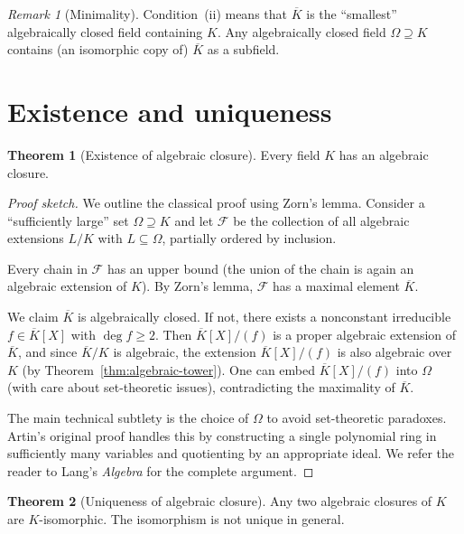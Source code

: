 \documentclass[12pt,a4paper,openany]{book}
\theoremstyle{definition}
\newtheorem{theorem}{Theorem}[chapter]
\theoremstyle{remark}
\newtheorem{remark}{Remark}[chapter]
\renewcommand{\deg}{\operatorname{deg}}
\begin{document}
\begin{remark}[Minimality]
\label{rem:alg-closure-minimal}
Condition~(ii) means that $\overline{K}$ is the ``smallest''
algebraically closed field containing $K$. Any algebraically closed
field $\Omega \supseteq K$ contains (an isomorphic copy of)
$\overline{K}$ as a subfield.
\end{remark}

\section{Existence and uniqueness}
\label{sec:alg-closure-existence}

\begin{theorem}[Existence of algebraic closure]
\label{thm:alg-closure-existence}
Every field $K$ has an algebraic closure.
\end{theorem}

\begin{proof}[Proof sketch]
We outline the classical proof using Zorn's lemma.
Consider a ``sufficiently large'' set $\Omega \supseteq K$ and let
$\mathcal{F}$ be the collection of all algebraic extensions $L/K$
with $L \subseteq \Omega$, partially ordered by inclusion.

Every chain in $\mathcal{F}$ has an upper bound (the union of the
chain is again an algebraic extension of $K$). By Zorn's lemma,
$\mathcal{F}$ has a maximal element $\overline{K}$.

We claim $\overline{K}$ is algebraically closed. If not, there exists
a nonconstant irreducible $f \in \overline{K}[X]$ with $\deg f \ge 2$.
Then $\overline{K}[X]/(f)$ is a proper algebraic extension of
$\overline{K}$, and since $\overline{K}/K$ is algebraic, the
extension $\overline{K}[X]/(f)$ is also algebraic over $K$ (by
Theorem~\ref{thm:algebraic-tower}). One can embed
$\overline{K}[X]/(f)$ into $\Omega$ (with care about set-theoretic
issues), contradicting the maximality of $\overline{K}$.

The main technical subtlety is the choice of $\Omega$ to avoid
set-theoretic paradoxes. Artin's original proof handles this by
constructing a single polynomial ring in sufficiently many variables
and quotienting by an appropriate ideal. We refer the reader to
Lang's \textit{Algebra} for the complete argument.
\end{proof}

\begin{theorem}[Uniqueness of algebraic closure]
\label{thm:alg-closure-uniqueness}
Any two algebraic closures of $K$ are $K$-isomorphic. The isomorphism
is not unique in general.
\end{theorem}
\end{document}
